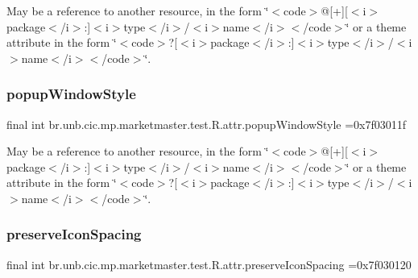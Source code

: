 May be a reference to another resource, in the form \char`\"{}$<$code$>$@\mbox{[}+\mbox{]}\mbox{[}$<$i$>$package$<$/i$>$\+:\mbox{]}$<$i$>$type$<$/i$>$/$<$i$>$name$<$/i$>$$<$/code$>$\char`\"{} or a theme attribute in the form \char`\"{}$<$code$>$?\mbox{[}$<$i$>$package$<$/i$>$\+:\mbox{]}$<$i$>$type$<$/i$>$/$<$i$>$name$<$/i$>$$<$/code$>$\char`\"{}. \mbox{\label{classbr_1_1unb_1_1cic_1_1mp_1_1marketmaster_1_1test_1_1R_1_1attr_a7068a9f9cea2452a03b07a5722998fd0}} 
\subsubsection{\texorpdfstring{popup\+Window\+Style}{popupWindowStyle}}
{\footnotesize\ttfamily final int br.\+unb.\+cic.\+mp.\+marketmaster.\+test.\+R.\+attr.\+popup\+Window\+Style =0x7f03011f\hspace{0.3cm}{\ttfamily [static]}}

May be a reference to another resource, in the form \char`\"{}$<$code$>$@\mbox{[}+\mbox{]}\mbox{[}$<$i$>$package$<$/i$>$\+:\mbox{]}$<$i$>$type$<$/i$>$/$<$i$>$name$<$/i$>$$<$/code$>$\char`\"{} or a theme attribute in the form \char`\"{}$<$code$>$?\mbox{[}$<$i$>$package$<$/i$>$\+:\mbox{]}$<$i$>$type$<$/i$>$/$<$i$>$name$<$/i$>$$<$/code$>$\char`\"{}. \mbox{\label{classbr_1_1unb_1_1cic_1_1mp_1_1marketmaster_1_1test_1_1R_1_1attr_acb92beeb6299acc38b42868c8224a136}} 
\subsubsection{\texorpdfstring{preserve\+Icon\+Spacing}{preserveIconSpacing}}
{\footnotesize\ttfamily final int br.\+unb.\+cic.\+mp.\+marketmaster.\+test.\+R.\+attr.\+preserve\+Icon\+Spacing =0x7f030120\hspace{0.3cm}{\ttfamily [static]}}

